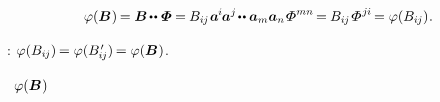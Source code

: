 \nopagebreak\vspace{-0.2em}\begin{equation*}
\varphi(\bm{B}\hspace{.1ex}) \hspace{-0.2ex}
= \bm{B} \hspace{-0.2ex} \dotdotp \hspace{-0.28ex} \scalebox{1.1}[1]{$\bm{\mathit{\Phi}}$} \hspace{-0.1ex}
= \hspace{-0.1ex} B_{i\hspace{-0.1ex}j} \hspace{.16ex} \bm{a}^{\hspace{-0.1ex}i} \hspace{-0.16ex} \bm{a}^j \hspace{-0.3ex} \dotdotp \bm{a}_m \bm{a}_n \hspace{-0.2ex} \scalebox{1.2}[1]{$\mathit{\Phi}$}^{mn} \hspace{-0.25ex}
= \hspace{-0.1ex} B_{i\hspace{-0.1ex}j} \hspace{-0.15ex} \scalebox{1.2}[1]{$\mathit{\Phi}$}^{\hspace{.1ex}j\hspace{-0.06ex}i} \hspace{-0.25ex}
= \varphi(B_{i\hspace{-0.1ex}j})
\hspace{.1ex} .
\end{equation*}

\vspace{-0.25em} \noindent
{}   :
${\varphi(B_{i\hspace{-0.1ex}j}) \hspace{-0.2ex} = \varphi(B\hspace{.16ex}'_{\hspace{-0.32ex}i\hspace{-0.1ex}j}) \hspace{-0.2ex} = \varphi(\bm{B}\hspace{.1ex})}$.

~${\varphi(\bm{B}\hspace{.1ex})}$ 

